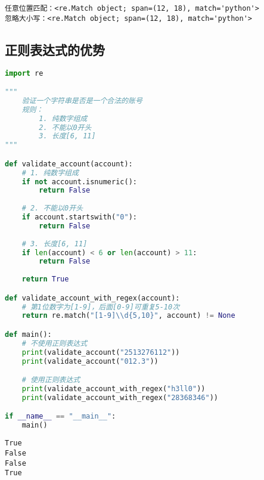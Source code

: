 \begin{tcolorbox}
	\begin{verbatim}
任意位置匹配：<re.Match object; span=(12, 18), match='python'>
忽略大小写：<re.Match object; span=(12, 18), match='python'>
\end{verbatim}
\end{tcolorbox}

\vspace{0.5cm}

\subsection{正则表达式的优势}


\begin{lstlisting}[language=Python]
import re

"""
    验证一个字符串是否是一个合法的账号
    规则：
        1. 纯数字组成
        2. 不能以0开头
        3. 长度[6, 11]
"""

def validate_account(account):
    # 1. 纯数字组成
    if not account.isnumeric():
        return False
    
    # 2. 不能以0开头
    if account.startswith("0"):
        return False
    
    # 3. 长度[6, 11]
    if len(account) < 6 or len(account) > 11:
        return False
    
    return True

def validate_account_with_regex(account):
    # 第1位数字为[1-9]，后面[0-9]可重复5-10次
    return re.match("[1-9]\\d{5,10}", account) != None

def main():
    # 不使用正则表达式
    print(validate_account("2513276112"))
    print(validate_account("012.3"))

    # 使用正则表达式
    print(validate_account_with_regex("h3ll0"))
    print(validate_account_with_regex("28368346"))

if __name__ == "__main__":
    main()
\end{lstlisting}

\begin{tcolorbox}
	\begin{verbatim}
True
False
False
True
\end{verbatim}
\end{tcolorbox}

\newpage

